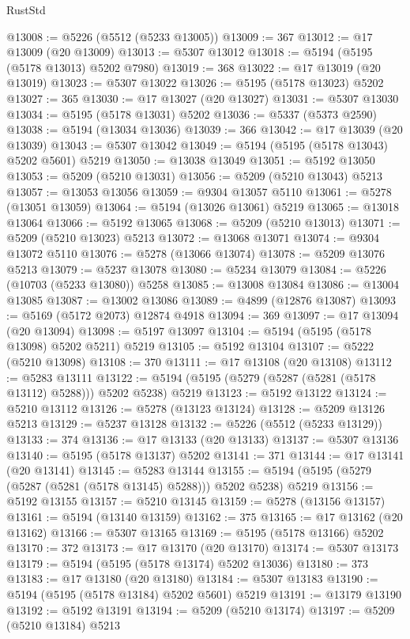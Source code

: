 \begin{lexlean}{RustStd}
\begin{coremodule}
@13008 := @5226 (@5512 (@5233 @13005))
@13009 := 367
@13012 := @17 @13009 (@20 @13009)
@13013 := @5307 @13012
@13018 := @5194 (@5195 (@5178 @13013) @5202 @7980)
@13019 := 368
@13022 := @17 @13019 (@20 @13019)
@13023 := @5307 @13022
@13026 := @5195 (@5178 @13023) @5202
@13027 := 365
@13030 := @17 @13027 (@20 @13027)
@13031 := @5307 @13030
@13034 := @5195 (@5178 @13031) @5202
@13036 := @5337 (@5373 @2590)
@13038 := @5194 (@13034 @13036)
@13039 := 366
@13042 := @17 @13039 (@20 @13039)
@13043 := @5307 @13042
@13049 := @5194 (@5195 (@5178 @13043) @5202 @5601) @5219
@13050 := @13038 @13049
@13051 := @5192 @13050
@13053 := @5209 (@5210 @13031)
@13056 := @5209 (@5210 @13043) @5213
@13057 := @13053 @13056
@13059 := @9304 @13057 @5110
@13061 := @5278 (@13051 @13059)
@13064 := @5194 (@13026 @13061) @5219
@13065 := @13018 @13064
@13066 := @5192 @13065
@13068 := @5209 (@5210 @13013)
@13071 := @5209 (@5210 @13023) @5213
@13072 := @13068 @13071
@13074 := @9304 @13072 @5110
@13076 := @5278 (@13066 @13074)
@13078 := @5209 @13076 @5213
@13079 := @5237 @13078
@13080 := @5234 @13079
@13084 := @5226 (@10703 (@5233 @13080)) @5258
@13085 := @13008 @13084
@13086 := @13004 @13085
@13087 := @13002 @13086
@13089 := @4899 (@12876 @13087)
@13093 := @5169 (@5172 @2073) @12874 @4918
@13094 := 369
@13097 := @17 @13094 (@20 @13094)
@13098 := @5197 @13097
@13104 := @5194 (@5195 (@5178 @13098) @5202 @5211) @5219
@13105 := @5192 @13104
@13107 := @5222 (@5210 @13098)
@13108 := 370
@13111 := @17 @13108 (@20 @13108)
@13112 := @5283 @13111
@13122 := @5194 (@5195 (@5279 (@5287 (@5281 (@5178 @13112) @5288))) @5202 @5238) @5219
@13123 := @5192 @13122
@13124 := @5210 @13112
@13126 := @5278 (@13123 @13124)
@13128 := @5209 @13126 @5213
@13129 := @5237 @13128
@13132 := @5226 (@5512 (@5233 @13129))
@13133 := 374
@13136 := @17 @13133 (@20 @13133)
@13137 := @5307 @13136
@13140 := @5195 (@5178 @13137) @5202
@13141 := 371
@13144 := @17 @13141 (@20 @13141)
@13145 := @5283 @13144
@13155 := @5194 (@5195 (@5279 (@5287 (@5281 (@5178 @13145) @5288))) @5202 @5238) @5219
@13156 := @5192 @13155
@13157 := @5210 @13145
@13159 := @5278 (@13156 @13157)
@13161 := @5194 (@13140 @13159)
@13162 := 375
@13165 := @17 @13162 (@20 @13162)
@13166 := @5307 @13165
@13169 := @5195 (@5178 @13166) @5202
@13170 := 372
@13173 := @17 @13170 (@20 @13170)
@13174 := @5307 @13173
@13179 := @5194 (@5195 (@5178 @13174) @5202 @13036)
@13180 := 373
@13183 := @17 @13180 (@20 @13180)
@13184 := @5307 @13183
@13190 := @5194 (@5195 (@5178 @13184) @5202 @5601) @5219
@13191 := @13179 @13190
@13192 := @5192 @13191
@13194 := @5209 (@5210 @13174)
@13197 := @5209 (@5210 @13184) @5213

\end{coremodule}
\end{lexlean}

